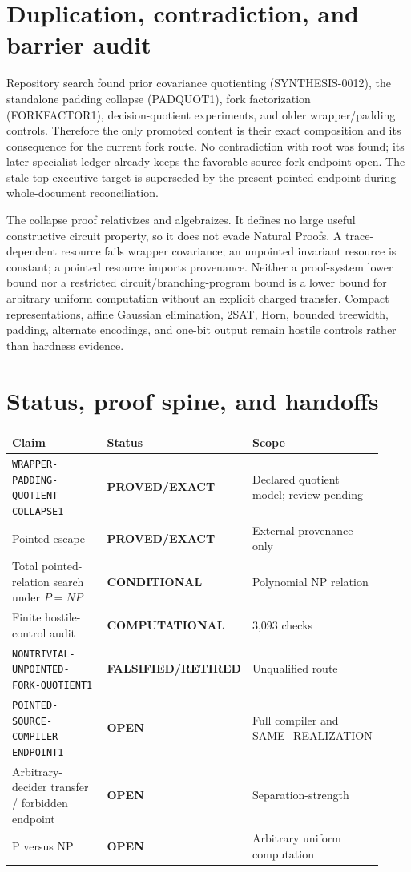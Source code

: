 \documentclass[11pt]{article}
\newcommand{\EXACT}{\textbf{PROVED/EXACT}}
\newcommand{\COMP}{\textbf{COMPUTATIONAL}}
\newcommand{\COND}{\textbf{CONDITIONAL}}
\newcommand{\OPEN}{\textbf{OPEN}}
\newcommand{\RETIRED}{\textbf{FALSIFIED/RETIRED}}
\begin{document}
\section{Duplication, contradiction, and barrier audit}
Repository search found prior covariance quotienting (SYNTHESIS-0012), the
standalone padding collapse (PADQUOT1), fork factorization (FORKFACTOR1),
decision-quotient experiments, and older wrapper/padding controls.  Therefore
the only promoted content is their exact composition and its consequence for
the current fork route.  No contradiction with root  was
found; its later specialist ledger already keeps the favorable source-fork
endpoint open.  The stale top executive target is superseded by the present
pointed endpoint during whole-document reconciliation.

The collapse proof relativizes and algebraizes.  It defines no large useful
constructive circuit property, so it does not evade Natural Proofs.  A
trace-dependent resource fails wrapper covariance; an unpointed invariant
resource is constant; a pointed resource imports provenance.  Neither a
proof-system lower bound nor a restricted circuit/branching-program bound is
a lower bound for arbitrary uniform computation without an explicit charged
transfer.  Compact representations, affine Gaussian elimination, 2SAT,
Horn, bounded treewidth, padding, alternate encodings, and one-bit output
remain hostile controls rather than hardness evidence.

\section{Status, proof spine, and handoffs}
\begin{center}\scriptsize
\begin{tabular}{p{0.47\linewidth}p{0.21\linewidth}p{0.24\linewidth}}
\toprule
Claim & Status & Scope\\ \midrule
\texttt{WRAPPER-PADDING-QUOTIENT-COLLAPSE1} & \EXACT & Declared quotient model; review pending\\
Pointed escape & \EXACT & External provenance only\\
Total pointed-relation search under \(P=NP\) & \COND & Polynomial NP relation\\
Finite hostile-control audit & \COMP & 3,093 checks\\
\texttt{NONTRIVIAL-UNPOINTED-FORK-QUOTIENT1} & \RETIRED & Unqualified route\\
\texttt{POINTED-SOURCE-COMPILER-ENDPOINT1} & \OPEN & Full compiler and SAME\_REALIZATION\\
Arbitrary-decider transfer / forbidden endpoint & \OPEN & Separation-strength\\
P versus NP & \OPEN & Arbitrary uniform computation\\
\bottomrule
\end{tabular}
\end{center}
\end{document}
